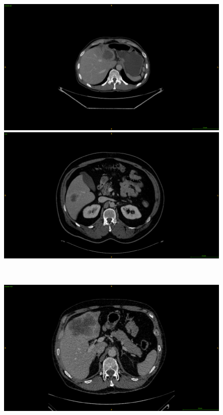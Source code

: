 \begin{figure}[!ht]
	\centering
	\begin{minipage}{0.45\linewidth}
		\includegraphics[width=\linewidth]{../Contributions/images/ResizeLITS_examplePatientSmallTumor_2}
	\end{minipage} \hspace{-0.1cm}
	\begin{minipage}{0.45\linewidth}
		\includegraphics[width=\linewidth]{../Contributions/images/ResizeTCIA_examplePatientSmallTumor}
	\end{minipage} \\
	\begin{minipage}{0.45\linewidth}
		\includegraphics[width=\linewidth]{../Contributions/images/ResizeLITS_examplePatientLargeTumor}

\end{minipage}
\end{figure}
